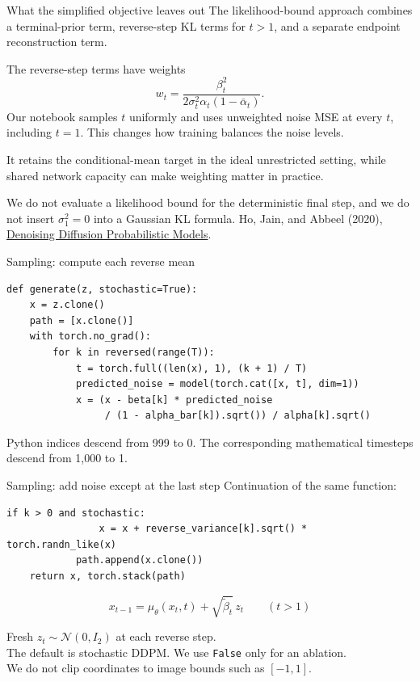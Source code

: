 \documentclass[aspectratio=169,11pt]{beamer}
\newcommand{\ddpmref}{\vfill{\tiny\color{gray}Ho, Jain, and Abbeel (2020), \href{https://arxiv.org/abs/2006.11239}{Denoising Diffusion Probabilistic Models}.}}
\begin{document}
\begin{frame}{What the simplified objective leaves out}
The likelihood-bound approach combines a terminal-prior term, reverse-step KL terms for $t>1$, and a separate endpoint reconstruction term.
\par\vspace{4mm}
The reverse-step terms have weights
\[w_t=\frac{\beta_t^2}{2\sigma_t^2\alpha_t(1-\bar\alpha_t)}.\]
Our notebook samples $t$ uniformly and uses unweighted noise MSE at every $t$, including $t=1$. This changes how training balances the noise levels.
\par\vspace{4mm}
It retains the conditional-mean target in the ideal unrestricted setting, while shared network capacity can make weighting matter in practice.
\par\vspace{3mm}
\small We do not evaluate a likelihood bound for the deterministic final step, and we do not insert $\sigma_1^2=0$ into a Gaussian KL formula.
\ddpmref
\end{frame}

\begin{frame}[fragile]{Sampling: compute each reverse mean}
\begin{lstlisting}[basicstyle=\ttfamily\footnotesize]
def generate(z, stochastic=True):
    x = z.clone()
    path = [x.clone()]
    with torch.no_grad():
        for k in reversed(range(T)):
            t = torch.full((len(x), 1), (k + 1) / T)
            predicted_noise = model(torch.cat([x, t], dim=1))
            x = (x - beta[k] * predicted_noise
                 / (1 - alpha_bar[k]).sqrt()) / alpha[k].sqrt()
\end{lstlisting}
\par\vspace{3mm}
Python indices descend from 999 to 0. The corresponding mathematical timesteps descend from 1,000 to 1.
\end{frame}

\begin{frame}[fragile]{Sampling: add noise except at the last step}
Continuation of the same function:
\begin{lstlisting}[basicstyle=\ttfamily\footnotesize]
            if k > 0 and stochastic:
                x = x + reverse_variance[k].sqrt() * torch.randn_like(x)
            path.append(x.clone())
    return x, torch.stack(path)
\end{lstlisting}
\[x_{t-1}=\mu_\theta(x_t,t)+\sqrt{\tilde\beta_t}\,z_t\qquad(t>1)\]
\par\vspace{3mm}
Fresh $z_t\sim\mathcal N(0,I_2)$ at each reverse step.\\[3mm]
The default is stochastic DDPM. We use \texttt{False} only for an ablation.\\[3mm]
We do not clip coordinates to image bounds such as $[-1,1]$.
\end{frame}
\end{document}
